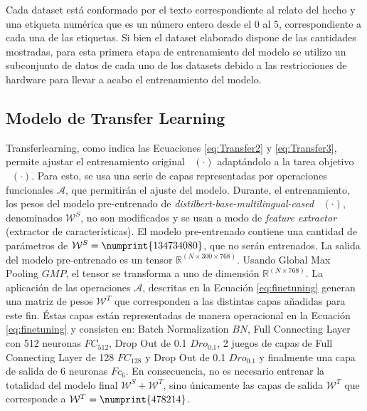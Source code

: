\documentclass[onecolumn, journal, english, 12pt, a4paper]{IEEEtran} %
\newcommand{\modelohuggingface}{distilbert-base-multilingual-cased}
\DeclareMathOperator{\ypredtarget}{\phi^{T}}
\DeclareMathOperator{\ypredsource}{\phi^{S}}
\theoremstyle{definition}
\begin{document}
Cada dataset está conformado por el texto correspondiente al relato del hecho y una etiqueta numérica que es un número entero desde el 0 al 5, correspondiente a cada una de las etiquetas. Si bien el dataset elaborado dispone de las cantidades mostradas, para esta primera etapa de entrenamiento del modelo se utilizo un subconjunto de datos de cada uno de los datasets debido a las restricciones de hardware para llevar a acabo el entrenamiento del modelo.


\subsection{Modelo de Transfer Learning}
Transferlearning, como indica las Ecuaciones \ref{eq:Transfer2} y \ref{eq:Transfer3}, permite ajustar el entrenamiento original $\ypredsource(\cdot)$ adaptándolo a la tarea objetivo $\ypredtarget(\cdot)$. Para esto, se usa una serie de capas representadas por operaciones funcionales $\mathcal{A}$, que permitirán el ajuste del modelo. Durante, el entrenamiento, los pesos del modelo pre-entrenado de \emph{\modelohuggingface} $\ypredsource(\cdot)$, denominados $\mathcal{W}^S$, no son modificados y se usan a modo de \emph{feature extractor} (extractor de características). El modelo pre-entrenado contiene una cantidad de parámetros de $\mathcal{W}^S = \numprint{134734080}$, que no serán entrenados. La salida del modelo pre-entrenado es un tensor $\mathbb{R}^{(N \times 300 \times 768)}$. Usando Global Max Pooling $GMP$, el tensor se transforma a uno de dimensión $\mathbb{R}^{(N \times 768)}$. La aplicación de las operaciones $\mathcal{A}$, descritas en la Ecuación  \ref{eq:finetuning} generan una matriz de pesos $\mathcal{W}^T$ que corresponden a las distintas capas añadidas para este fin. Éstas capas están representadas de manera operacional en la Ecuación \ref{eq:finetuning} y consisten en: Batch Normalization $BN$, Full Connecting Layer con 512 neuronas $FC_{512}$, Drop Out de 0.1 $Dro_{0.1}$, 2 juegos de capas de Full Connecting Layer de 128 $FC_{128}$ y Drop Out de 0.1 $Dro_{0.1}$ y finalmente una capa de salida de 6 neuronas $Fc_{6}$. En consecuencia, no es necesario entrenar la totalidad del modelo final $\mathcal{W}^S+\mathcal{W}^T$, sino únicamente las capas de salida $\mathcal{W}^T$ que corresponde a $\mathcal{W}^T = \numprint{478214}$.

\end{document}
